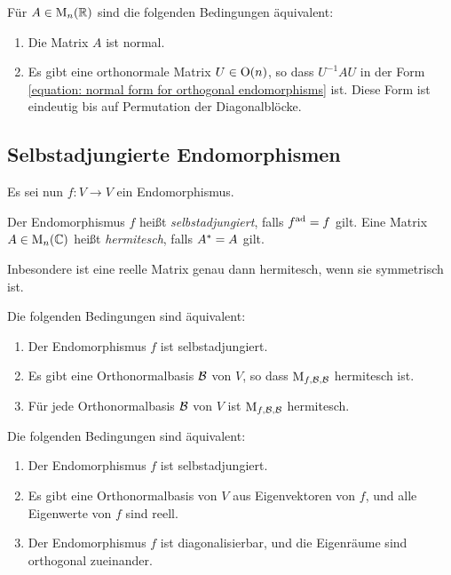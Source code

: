 \begin{corollary}
  Für $A \in \operatorname{M}_{n}(\mathbb{R})$ sind die folgenden Bedingungen äquivalent:
  \begin{enumerate}
    \item
      Die Matrix $A$ ist normal.
    \item
      Es gibt eine orthonormale Matrix $U \in \operatorname{O}(n)$, so dass $U^{-1} A U$ in der Form \eqref{equation: normal form for orthogonal endomorphisms} ist.
      Diese Form ist eindeutig bis auf Permutation der Diagonalblöcke.
  \end{enumerate}
\end{corollary}





\subsection{Selbstadjungierte Endomorphismen}

Es sei nun $f \colon V \to V$ ein Endomorphismus.

\begin{definition}
  Der Endomorphismus $f$ heißt \emph{selbstadjungiert}, falls $f^{\operatorname{ad}} = f$ gilt.
  Eine Matrix $A \in \operatorname{M}_{n}(\mathbb{C})$ heißt \emph{hermitesch}, falls $A^* = A$ gilt.
\end{definition}

Inbesondere ist eine reelle Matrix genau dann hermitesch, wenn sie symmetrisch ist.

\begin{lemma}
  Die folgenden Bedingungen sind äquivalent:
  \begin{enumerate}
    \item
      Der Endomorphismus $f$ ist selbstadjungiert.
    \item
      Es gibt eine Orthonormalbasis $\mathcal{B}$ von $V$, so dass $\operatorname{M}_{f, \mathcal{B}, \mathcal{B}}$ hermitesch ist.
    \item
      Für jede Orthonormalbasis $\mathcal{B}$ von $V$ ist $\operatorname{M}_{f, \mathcal{B}, \mathcal{B}}$ hermitesch.
  \end{enumerate}
\end{lemma}

\begin{theorem}
  Die folgenden Bedingungen sind äquivalent:
  \begin{enumerate}
    \item
      Der Endomorphismus $f$ ist selbstadjungiert.
    \item
      Es gibt eine Orthonormalbasis von $V$ aus Eigenvektoren von $f$, und alle Eigenwerte von $f$ sind reell.
    \item
      Der Endomorphismus $f$ ist diagonalisierbar, und die Eigenräume sind orthogonal zueinander.
  \end{enumerate}
\end{theorem}

